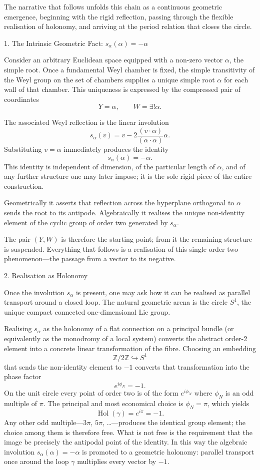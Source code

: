 The narrative that follows unfolds this chain as a continuous geometric emergence, beginning with the rigid reflection, passing through the flexible realisation of holonomy, and arriving at the period relation that closes the circle.

1. The Intrinsic Geometric Fact: \(s_\alpha(\alpha)=-\alpha\)

Consider an arbitrary Euclidean space equipped with a non-zero vector \(\alpha\), the simple root. Once a fundamental Weyl chamber is fixed, the simple transitivity of the Weyl group on the set of chambers supplies a unique simple root \(\alpha\) for each wall of that chamber. This uniqueness is expressed by the compressed pair of coordinates
\[
Y=\alpha,\qquad W=\exists!\alpha.
\]

The associated Weyl reflection is the linear involution
\[
s_\alpha(v)=v-2\frac{(v\cdot\alpha)}{(\alpha\cdot\alpha)}\alpha.
\]
Substituting \(v=\alpha\) immediately produces the identity
\[
s_\alpha(\alpha)=-\alpha.
\]
This identity is independent of dimension, of the particular length of \(\alpha\), and of any further structure one may later impose; it is the sole rigid piece of the entire construction.  

Geometrically it asserts that reflection across the hyperplane orthogonal to \(\alpha\) sends the root to its antipode.  
Algebraically it realises the unique non-identity element of the cyclic group of order two generated by \(s_\alpha\).

The pair \((Y,W)\) is therefore the starting point; from it the remaining structure is suspended. Everything that follows is a realisation of this single order-two phenomenon—the passage from a vector to its negative.

2. Realisation as Holonomy

Once the involution \(s_\alpha\) is present, one may ask how it can be realised as parallel transport around a closed loop. The natural geometric arena is the circle \(S^1\), the unique compact connected one-dimensional Lie group.

Realising \(s_\alpha\) as the holonomy of a flat connection on a principal bundle (or equivalently as the monodromy of a local system) converts the abstract order-2 element into a concrete linear transformation of the fibre. Choosing an embedding
\[
\mathbb{Z}/2\mathbb{Z}\hookrightarrow S^1
\]
that sends the non-identity element to \(-1\) converts that transformation into the phase factor
\[
e^{i\phi_N}=-1.
\]
On the unit circle every point of order two is of the form \(e^{i\phi_N}\) where \(\phi_N\) is an odd multiple of \(\pi\). The principal and most economical choice is \(\phi_N=\pi\), which yields
\[
\operatorname{Hol}(\gamma)=e^{i\pi}=-1.
\]
Any other odd multiple—\(3\pi\), \(5\pi\), \ldots—produces the identical group element; the choice among them is therefore free. What is not free is the requirement that the image be precisely the antipodal point of the identity. In this way the algebraic involution \(s_\alpha(\alpha)=-\alpha\) is promoted to a geometric holonomy: parallel transport once around the loop \(\gamma\) multiplies every vector by \(-1\).

